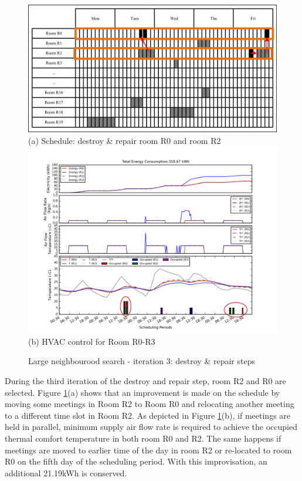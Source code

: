 \begin{figure}
	\centering
		\includegraphics[width=0.9\linewidth]{figs/lns_sche_ds3.jpg}\\
(a) Schedule: destroy \& repair room R0 and room R2  \\[6pt]
		\includegraphics[width=1\linewidth]{figs/lns_dr3.png} \\
(b) HVAC control for Room R0-R3  \\[6pt]
	\caption{Large neighbourood search - iteration 3: destroy \& repair steps}
	\label{fig:lns_dr3}
\end{figure}

During the third iteration of the destroy and repair step, room R2 and R0 are selected. Figure \ref{fig:lns_dr3}(a) shows that an improvement is made on the schedule by moving some meetings in Room R2 to Room R0 and relocating another meeting to a different time slot in Room R2. As depicted in Figure \ref{fig:lns_dr3}(b), if meetings are held in parallel, minimum supply air flow rate is required to achieve the occupied thermal comfort temperature in both room R0 and R2. The same happens if meetings are moved to earlier time of the day in room R2 or re-located to room R0 on the fifth day of the scheduling period. With this improvisation, an additional 21.19kWh is conserved.

